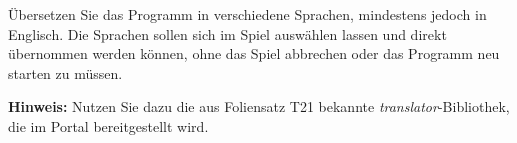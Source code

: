 \"Ubersetzen Sie das Programm in verschiedene Sprachen, mindestens
jedoch in Englisch. Die Sprachen sollen sich im Spiel ausw\"ahlen
lassen und direkt \"ubernommen werden k\"onnen, ohne das Spiel
abbrechen oder das Programm neu starten zu m\"ussen.

\textbf{Hinweis:} Nutzen Sie dazu die aus Foliensatz T21 bekannte
\emph{translator}-Bibliothek, die im Portal bereitgestellt wird.